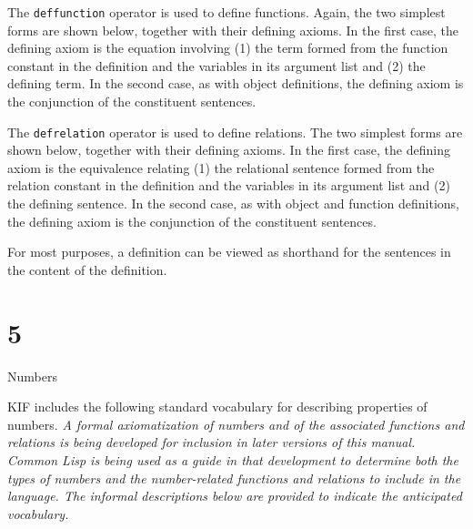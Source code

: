 \bigskip
\centerline{\vbox{}}
\bigskip

The {\tt deffunction} operator is used to define functions.  Again, the two simplest
forms are shown below, together with their defining axioms.  In the first case, the
defining axiom is the equation involving (1) the term formed from the function constant
in the definition and the variables in its argument list and (2) the defining term.  In
the second case, as with object definitions, the defining axiom is the conjunction of
the constituent sentences.

\bigskip
\centerline{\vbox{}}
\bigskip

The {\tt defrelation} operator is used to define relations.  The two simplest forms are
shown below, together with their defining axioms.  In the first case, the defining
axiom is the equivalence relating (1) the relational sentence formed from the relation
constant in the definition and the variables in its argument list and (2) the defining
sentence.  In the second case, as with object and function definitions, the defining
axiom is the conjunction of the constituent sentences.

\bigskip
\centerline{\vbox{}}
\bigskip

For most purposes, a definition can be viewed as shorthand for the sentences in the content of the definition.

\vfill\eject

\chapter{5}{Numbers}

KIF includes the following standard vocabulary for describing
properties of numbers.  {\it A formal axiomatization of numbers and of
the associated functions and relations is being developed for inclusion
in later versions of this manual.  Common Lisp is being used as a guide
in that development to determine both the types of numbers and the
number-related functions and relations to include in the language.  The
informal descriptions below are provided to indicate the anticipated
vocabulary.}

